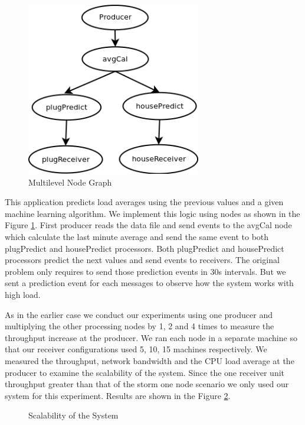 \begin{figure}[!t]
        \centering
        \includegraphics[width=3.0in]{multigraph.png}
        \caption{Multilevel Node Graph}
        \label{multigraph}
\end{figure}

This application predicts load averages using the previous values and a given machine learning algorithm. We implement this logic using nodes as shown in the Figure \ref{multigraph}. First producer reads the data file and send events to the avgCal node which calculate the last minute average and send the same event to both plugPredict and housePredict processors. Both plugPredict and housePredict processors predict the next values and send events to receivers. The original problem only requires to send those prediction events in 30s intervals. But we sent a prediction event for each messages to observe how the system works with high load.
 
As in the earlier case we conduct our experiments using one producer and multiplying the other processing nodes by 1, 2 and 4 times to measure the throughput increase at the producer. We ran each node in a separate machine so that our receiver configurations used 5, 10, 15 machines respectively. We measured the throughput,  network bandwidth and the CPU load average at the producer to examine the scalability of the system. Since the one receiver unit throughput greater than that of the storm one node scenario we only used our system for this experiment.  Results are shown in the Figure \ref{scalability}.


\begin{figure}[!t]
        \centering
        \hfil
        \hfil
        \hfil
        \caption{Scalability of the System}
        \label{scalability}
\end{figure}


